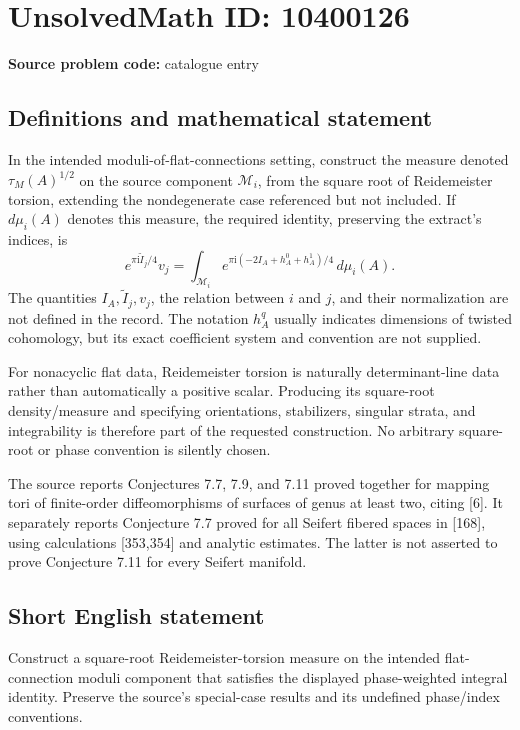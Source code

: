 \documentclass[11pt]{article}
\begin{document}
\section*{UnsolvedMath ID: 10400126}
\textbf{Source problem code:} catalogue entry
\subsection{Definitions and mathematical statement}
In the intended moduli-of-flat-connections setting, construct the measure denoted $\tau_M(A)^{1/2}$ on the source component $\mathcal M_i$, from the square root of Reidemeister torsion, extending the nondegenerate case referenced but not included. If $d\mu_i(A)$ denotes this measure, the required identity, preserving the extract's indices, is
\[
e^{\pi\mathrm i\widetilde I_j/4}v_j
=\int_{\mathcal M_i}
 e^{\pi\mathrm i(-2I_A+h_A^0+h_A^1)/4}\,d\mu_i(A).
\]
The quantities $I_A,\widetilde I_j,v_j$, the relation between $i$ and $j$, and their normalization are not defined in the record. The notation $h_A^q$ usually indicates dimensions of twisted cohomology, but its exact coefficient system and convention are not supplied.

For nonacyclic flat data, Reidemeister torsion is naturally determinant-line data rather than automatically a positive scalar. Producing its square-root density/measure and specifying orientations, stabilizers, singular strata, and integrability is therefore part of the requested construction. No arbitrary square-root or phase convention is silently chosen.

The source reports Conjectures 7.7, 7.9, and 7.11 proved together for mapping tori of finite-order diffeomorphisms of surfaces of genus at least two, citing [6]. It separately reports Conjecture 7.7 proved for all Seifert fibered spaces in [168], using calculations [353,354] and analytic estimates. The latter is not asserted to prove Conjecture 7.11 for every Seifert manifold.
\subsection{Short English statement}
Construct a square-root Reidemeister-torsion measure on the intended flat-connection moduli component that satisfies the displayed phase-weighted integral identity. Preserve the source's special-case results and its undefined phase/index conventions.
\end{document}
